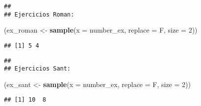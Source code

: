\documentclass[]{article}
\newenvironment{Shaded}{\begin{snugshade}}{\end{snugshade}}
\newcommand{\CharTok}[1]{\textcolor[rgb]{0.31,0.60,0.02}{#1}}
\newcommand{\CommentTok}[1]{\textcolor[rgb]{0.56,0.35,0.01}{\textit{#1}}}
\newcommand{\DataTypeTok}[1]{\textcolor[rgb]{0.13,0.29,0.53}{#1}}
\newcommand{\DecValTok}[1]{\textcolor[rgb]{0.00,0.00,0.81}{#1}}
\newcommand{\KeywordTok}[1]{\textcolor[rgb]{0.13,0.29,0.53}{\textbf{#1}}}
\newcommand{\NormalTok}[1]{#1}
\newcommand{\OperatorTok}[1]{\textcolor[rgb]{0.81,0.36,0.00}{\textbf{#1}}}
\newcommand{\StringTok}[1]{\textcolor[rgb]{0.31,0.60,0.02}{#1}}
\begin{document}
\begin{verbatim}
## 
## Ejercicios Roman:
\end{verbatim}

\begin{Shaded}
\begin{Highlighting}[]
\NormalTok{(ex_roman <-}\StringTok{ }\KeywordTok{sample}\NormalTok{(}\DataTypeTok{x =}\NormalTok{ number_ex, }\DataTypeTok{replace =}\NormalTok{ F, }\DataTypeTok{size =} \DecValTok{2}\NormalTok{))}
\end{Highlighting}
\end{Shaded}

\begin{verbatim}
## [1] 5 4
\end{verbatim}

\begin{Shaded}
\end{Shaded}

\begin{verbatim}
## 
## Ejercicios Sant:
\end{verbatim}

\begin{Shaded}
\begin{Highlighting}[]
\NormalTok{(ex_sant <-}\StringTok{ }\KeywordTok{sample}\NormalTok{(}\DataTypeTok{x =}\NormalTok{ number_ex, }\DataTypeTok{replace =}\NormalTok{ F, }\DataTypeTok{size =} \DecValTok{2}\NormalTok{))}
\end{Highlighting}
\end{Shaded}

\begin{verbatim}
## [1] 10  8
\end{verbatim}

\begin{Shaded}
\end{Shaded}
\end{document}
